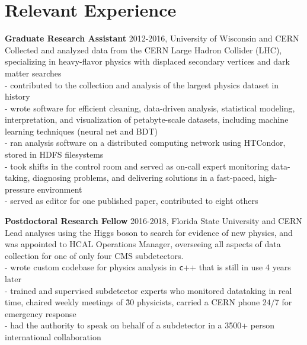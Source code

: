 \documentclass[letterpaper,12pt]{article} %
\begin{document}
\section{Relevant Experience}
 {\large {\bf Graduate Research Assistant} 2012-2016, University of Wisconsin and CERN} \\
  Collected and analyzed data from the CERN Large Hadron Collider (LHC), specializing in heavy-flavor physics with displaced secondary vertices and dark matter searches  \\ %
 - contributed to the collection and analysis of the largest physics dataset in history \\
 - wrote software for efficient cleaning, data-driven analysis, statistical modeling, interpretation, and visualization of petabyte-scale datasets, including machine learning techniques (neural net and BDT) \\
 - ran analysis software on a distributed computing network using HTCondor, stored in HDFS filesystems \\
 - took shifts in the control room and served as on-call expert monitoring data-taking, diagnosing problems, and delivering solutions in a fast-paced, high-pressure environment  \\
 - served as editor for one published paper, contributed to eight others 

 {\large {\bf Postdoctoral Research Fellow} 2016-2018, Florida State University and CERN}  \\
 Lead analyses using the Higgs boson to search for evidence of new physics, and was appointed to HCAL Operations Manager, overseeing all aspects of data collection for one of only four CMS subdetectors. \\ %
- wrote custom codebase for physics analysis in {\texttt c++} that is still in use 4 years later \\
- trained and supervised subdetector experts who monitored datataking in real time, chaired weekly meetings of \~30 physicists, carried a CERN phone 24/7 for emergency response \\
- had the authority to speak on behalf of a subdetector in a 3500+ person international collaboration
\end{document}
